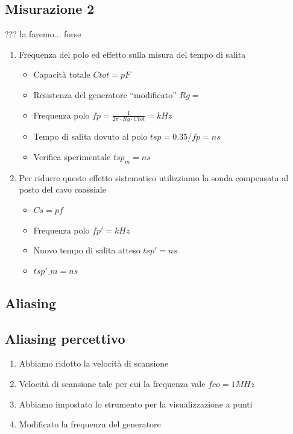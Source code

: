 \documentclass[a4paper]{article}
\begin{document}
\subsection{Misurazione 2}
\colorbox{ProcessBlue}{??? la faremo... forse}

\begin{enumerate}
\item Frequenza del polo ed effetto sulla misura del tempo di salita
  \begin{itemize}
    \item Capacità totale \(Ctot = pF\)
    \item Resistenza del generatore ``modificato'' \(Rg= \)
    \item Frequenza polo \(fp = \tfrac{1}{2\pi \cdot Rg \cdot Ctot} = kHz \)
    \item Tempo di salita dovuto al polo \(tsp= 0.35/fp = ns\)
    \item Verifica sperimentale \(tsp_m = ns\)
    \end{itemize}

\item Per ridurre questo effetto sistematico utilizziamo la sonda compensata al posto del cavo coassiale
 \begin{itemize}
 \item  \(Cs= pf\)
 \item Frequenza polo \(fp' = kHz\)
 \item Nuovo tempo di salita atteso \(tsp'= ns\)
 \item \(tsp'\_m= ns\)
 \end{itemize}
\end{enumerate}



\begin{tcolorbox}[breakable,colback=cyan,colframe=cyan]
\section*{Aliasing}
\end{tcolorbox}


\subsection{Aliasing percettivo}
 \begin{enumerate}
  \item Abbiamo ridotto la velocità di scansione
  \item Velocità di scansione tale per cui la frequenza vale \(fco= 1 MHz\)
  \item Abbiamo impostato lo strumento per la visualizzazione a punti
  \item Modificato la frequenza del generatore
 \end{enumerate}
\end{document}
